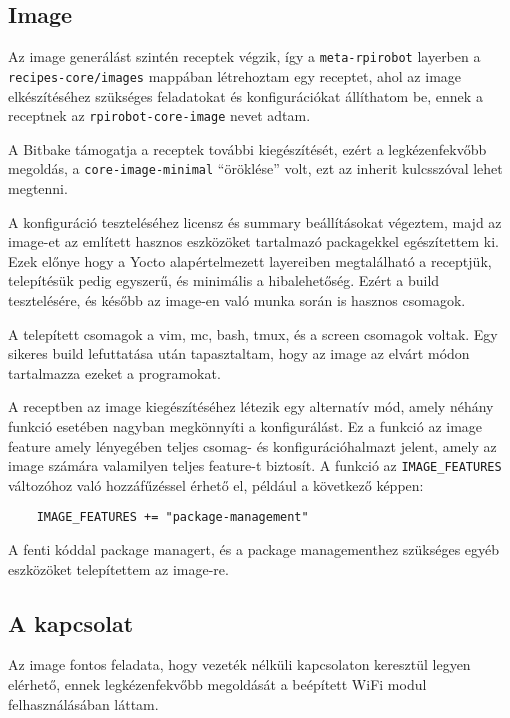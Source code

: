 \subsection{Image}

Az image generálást szintén receptek végzik, így a \verb|meta-rpirobot| layerben
a \verb|recipes-core/images| mappában létrehoztam egy receptet, ahol az image
elkészítéséhez szükséges feladatokat és konfigurációkat állíthatom be, ennek a
receptnek az \verb|rpirobot-core-image| nevet adtam.

A Bitbake támogatja a receptek további kiegészítését, ezért a legkézenfekvőbb
megoldás, a \verb|core-image-minimal| ``öröklése'' volt, ezt az inherit
kulcsszóval lehet megtenni.

A konfiguráció teszteléséhez licensz és summary beállításokat végeztem, majd az
image-et az említett hasznos eszközöket tartalmazó packagekkel egészítettem
ki. Ezek előnye hogy a Yocto alapértelmezett layereiben megtalálható a receptjük,
telepítésük pedig egyszerű, és minimális a hibalehetőség. Ezért a build
tesztelésére, és később az image-en való munka során is hasznos csomagok.

A telepített csomagok a vim, mc, bash, tmux, és a screen csomagok voltak. Egy
sikeres build lefuttatása után tapasztaltam, hogy az image az elvárt módon
tartalmazza ezeket a programokat. 

\medskip

A receptben az image kiegészítéséhez létezik egy alternatív mód, amely néhány
funkció esetében nagyban megkönnyíti a konfigurálást. Ez a funkció az image
feature amely lényegében teljes csomag- és konfigurációhalmazt jelent, amely az
image számára valamilyen teljes feature-t biztosít. A funkció az
\verb|IMAGE_FEATURES| változóhoz való hozzáfűzéssel érhető el, például a
következő képpen:

\begin{verbatim}
    IMAGE_FEATURES += "package-management"
\end{verbatim}

A fenti kóddal package managert, és a package managementhez szükséges egyéb
eszközöket telepítettem az image-re.

\subsection{A kapcsolat}

Az image fontos feladata, hogy vezeték nélküli kapcsolaton keresztül legyen
elérhető, ennek legkézenfekvőbb megoldását a beépített WiFi modul
felhasználásában láttam.

